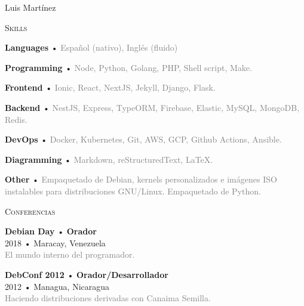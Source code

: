 \documentclass[12pt]{article}
\begin{document}
\begin{cv}{Luis Mart\'inez}
\begin{minipage}[t]{0.35\textwidth}
    \vspace{0.25em}
    \begin{minipage}{\linewidth}
      \textrm{\textsc{\Large{Skills}}}
      \newline
      \parbox[t]{\linewidth}{
        \textbf{Languages} • \footnotesize{\textcolor{gray}{Español (nativo), Inglés (fluido)}}
      }
      \parbox[t]{\linewidth}{
        \textbf{Programming} • \footnotesize{\textcolor{gray}{Node, Python, Golang, PHP, Shell script, Make.}}
      }
      \parbox[t]{\linewidth}{
        \textbf{Frontend} • \footnotesize{\textcolor{gray}{Ionic, React, NextJS, Jekyll, Django, Flask.}}
      }
      \parbox[t]{\linewidth}{
        \textbf{Backend} • \footnotesize{\textcolor{gray}{NestJS, Express, TypeORM, Firebase, Elastic, MySQL, MongoDB, Redis.}}
      }
      \parbox[t]{\linewidth}{
        \textbf{DevOps} • \footnotesize{\textcolor{gray}{Docker, Kubernetes, Git, AWS, GCP, Github Actions, Ansible.}}
      }
      \parbox[t]{\linewidth}{
        \textbf{Diagramming} • \footnotesize{\textcolor{gray}{Markdown, reStructuredText, \LaTeX.}}
      }
      \parbox[t]{\linewidth}{
        \textbf{Other} • \footnotesize{\textcolor{gray}{Empaquetado de Debian, kernels personalizados e imágenes ISO instalables para distribuciones GNU/Linux. Empaquetado de Python.}}
      }
      \newline
      \newline
    \end{minipage}

    \vspace{0.25em}
    \begin{minipage}{\linewidth}
      \textrm{\textsc{\Large{Conferencias}}}
      \newline
      \parbox[t]{\linewidth}{
        \textbf{Debian Day} • \textrm{\textbf{Orador}}\\
        2018 • Maracay, Venezuela\\
        \footnotesize{\textcolor{gray}{El mundo interno del programador.}}\\
      }
      \newline
      \parbox[t]{\linewidth}{
        \textbf{DebConf 2012} • \textrm{\textbf{Orador/Desarrollador}}\\
        2012 • Managua, Nicaragua\\
        \footnotesize{\textcolor{gray}{Haciendo distribuciones derivadas con Canaima Semilla.}}\\
      }
      \newline
    \end{minipage}


\end{minipage}
\end{cv}
\end{document}

